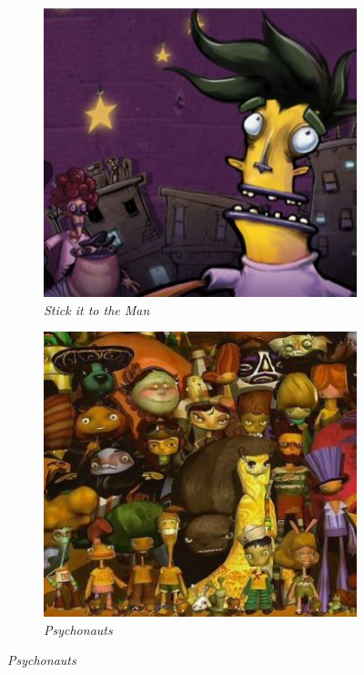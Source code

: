 \begin{figure}[H]
\centering %
\begin{subfigure}{.4\textwidth}
\centering
\includegraphics[width=.9\linewidth]{images/ref_sittm}
\caption{\textit{Stick it to the Man}}
\label{fig:artref1}
\end{subfigure} %
\begin{subfigure}{.4\textwidth}
\centering
\includegraphics[width=.9\linewidth]{images/ref_psychonauts}
\caption{\textit{Psychonauts}}
\label{fig:artref2}
\end{subfigure} %

\end{figure}
